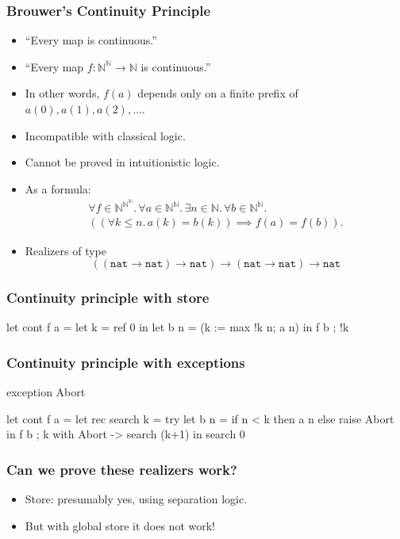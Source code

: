 \documentclass[t]{beamer}
\newcommand{\NN}{\mathbb{N}}
\newcommand{\nat}{\mathtt{nat}}
\begin{document}
\begin{frame}
  \frametitle{Brouwer's Continuity Principle}

  \begin{itemize}
  \item ``Every map is continuous.''
  \item ``Every map $f : \NN^\NN \to \NN$ is continuous.''
  \item 
    In other words, $f(a)$ depends only on a finite prefix of
    $a(0), a(1), a(2), \ldots$.
  \item Incompatible with classical logic.
  \item Cannot be proved in intuitionistic logic.
  \item As a formula:
    \begin{multline*}
      \forall f \in \NN^{\NN^\NN} .\,
      \forall a \in  \NN^\NN.\,
      \exists n \in \NN .\,
      \forall b \in \NN^\NN .\,\\
      ((\forall k \leq n .\, a(k) = b(k)) \implies f(a) = f(b)).
    \end{multline*}
  \item Realizers of type
    \begin{equation*}
      ((\nat \to \nat) \to \nat) \to (\nat \to \nat) \to \nat
    \end{equation*}
  \end{itemize}
\end{frame}

\begin{frame}[fragile]
  \frametitle{Continuity principle with store}

\begin{source}
let cont f a =
  let k = ref 0 in
  let b n = (k := max !k n; a n) in
    f b ; !k
\end{source}

\end{frame}

\begin{frame}[fragile]
  \frametitle{Continuity principle with exceptions}

\begin{source}
exception Abort

let cont f a =
  let rec search k =
    try
      let b n = 
        if n < k then a n else raise Abort
      in
        f b ; k
    with Abort -> search (k+1)
  in
    search 0
\end{source}
\end{frame}

\begin{frame}
  \frametitle{Can we prove these realizers work?}

  \begin{itemize}
  \item Store: presumably yes, using separation logic.
  \item But with global store it does not work!
  \end{itemize}
\end{frame}
\end{document}

